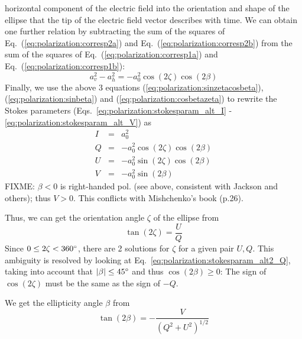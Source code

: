 horizontal component of the electric field into the orientation and
shape of the ellipse that the tip of the electric field vector describes with
time.  We can obtain one further relation by subtracting the sum of
the squares of Eq.~(\ref{eq:polarization:corresp2a}) and
Eq.~(\ref{eq:polarization:corresp2b}) from the sum of the squares of
Eq.~(\ref{eq:polarization:corresp1a}) and
Eq.~(\ref{eq:polarization:corresp1b}):
\begin{equation}
  \label{eq:polarization:cosbetazeta}
 a_v^2 - a_h^2 =  -a_0^2 \cos(2\zeta)\cos(2\beta)
\end{equation}
Finally, we use the above 3 equations
(\ref{eq:polarization:sinzetacosbeta}), 
(\ref{eq:polarization:sinbeta}) and 
(\ref{eq:polarization:cosbetazeta}) to rewrite the Stokes parameters
(Eqs.~\ref{eq:polarization:stokesparam_alt_I}%
-\ref{eq:polarization:stokesparam_alt_V}) 
as
\begin{eqnarray}
  \label{eq:polarization:stokesparam_alt2_I}
 I &=& a_0^2\\
  \label{eq:polarization:stokesparam_alt2_Q}
 Q &=&  -a_0^2 \cos(2\zeta)\cos(2\beta)\\ 
  \label{eq:polarization:stokesparam_alt2_U}
 U &=& -a_0^2 \sin(2\zeta)\cos(2\beta)\\
  \label{eq:polarization:stokesparam_alt2_V}
 V &=& -a_0^2 \sin(2\beta)
\end{eqnarray}
FIXME: $\beta<0$ is right-handed pol. (see above, consistent with
Jackson and others); thus $V>0$. This conflicts with Mishchenko's book
(p.26).
  

Thus, we can get the orientation angle $\zeta$ of the ellipse from
\begin{equation}
  \label{eq:polarization:tan2zeta}
 \tan(2\zeta) = \frac{U}{Q}
\end{equation}
Since $0 \leq 2\zeta < 360^\circ$, there are 2 solutions for $\zeta$ for a
given pair $U,Q$. This ambiguity is resolved by looking at
Eq.~\ref{eq:polarization:stokesparam_alt2_Q}, taking into account that
$|\beta| \leq 45^\circ$ and thus $\cos(2\beta) \geq 0$:
The sign of $\cos(2\zeta)$ must be the same as the sign of $-Q$.

We get the ellipticity angle $\beta$  from
\begin{equation}
  \label{eq:polarization:tan2beta}
 \tan(2\beta) = - \frac{V}{(Q^2 + U^2)^{1/2}}  
\end{equation}

